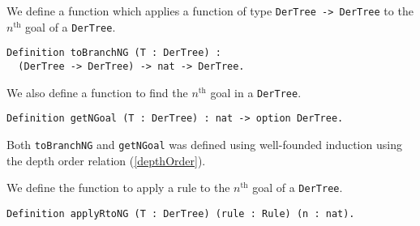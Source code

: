 \documentclass{llncs}
\newcommand{\comment}[1]{}
\begin{document}
We define a function which applies a function of type
\verb+DerTree -> DerTree+ to the $n^{\textrm{th}}$ goal of a \verb+DerTree+.
%
\begin{verbatim}
Definition toBranchNG (T : DerTree) :
  (DerTree -> DerTree) -> nat -> DerTree.
\end{verbatim}
%
We also define a function to find the $n^{\textrm{th}}$ goal in a
\verb+DerTree+.
%
\begin{verbatim}
Definition getNGoal (T : DerTree) : nat -> option DerTree.
\end{verbatim}
%
Both \verb+toBranchNG+ and \verb+getNGoal+ was defined using well-founded
induction using the depth order relation (\ref{depthOrder}).

\comment{
Additionally we define a map function for option types.
%
\begin{verbatim}
Definition optionSucMap (A B : Type) (f : A -> option B)
  (xs : list A) : option (list B).
\end{verbatim}
%
\verb+optionSucMap+ applies \verb+f+ to each element in \verb+xs+. For each of
the results which do not return \verb+None+, the result is appended to a list
which is the return value of the function.  If the final list is empty,
\verb+None+ is returned.

We also define the following simple function which returns a function which
returns a \verb+DerTree+.
%
\begin{verbatim}
Definition updateLeaf (T : DerTree) :
  (DerTree -> DerTree) := fun _ => T.
\end{verbatim}
%
}
We define the function to apply a rule to the $n^{\textrm{th}}$ goal of a
\verb+DerTree+.
%
\begin{verbatim}
Definition applyRtoNG (T : DerTree) (rule : Rule) (n : nat).
\end{verbatim}
\comment{
\begin{verbatim}
Definition applyRtoNG (T : DerTree) (rule : Rule) (n : nat) :=
  match getNGoal T n with
  | None      => None
  | Some goal => 
      match goal with
      | Unf propset =>
        match getPartitions (getNumerator rule) propset with
                 | nil => None
                 | res => match optionSucMap
                   (applyPartitionRuleD rule propset) res with
                     | None          => None
                     | Some newNodes => Some
                       (map (fun x => toBranchNG T x n)
                       (map updateLeaf newNodes))
                     end
                 end
      | _ => None
      end
  end.
\end{verbatim}
}
\end{document}
